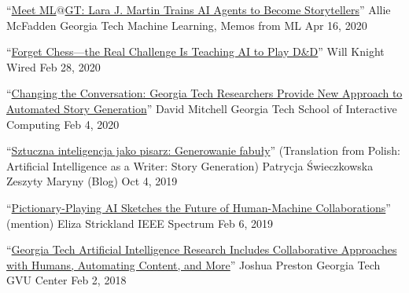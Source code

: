   \cvmedia
    {``\href{https://mlatgt.blog/2020/04/16/meet-mlgt-lara-j-martin-trains-ai-agents-to-become-storytellers/}{Meet ML$@$GT: Lara J. Martin Trains AI Agents to Become Storytellers}''} %
    {Allie McFadden} %
    {Georgia Tech Machine Learning, Memos from ML\@GT} %
    {Apr 16, 2020} %

  \cvmedia
    {``\href{https://www.wired.com/story/forget-chess-real-challenge-teaching-ai-play-dandd/}{Forget Chess---the Real Challenge Is Teaching AI to Play D\&D}''} %
    {Will Knight} %
    {Wired} %
    {Feb 28, 2020} %

  \cvmedia
    {``\href{https://www.ic.gatech.edu/news/632082/changing-conversation-georgia-tech-researchers-provide-new-approach-automated-story}{Changing the Conversation: Georgia Tech Researchers Provide New Approach to Automated Story Generation}''} %
    {David Mitchell} %
    {Georgia Tech School of Interactive Computing} %
    {Feb 4, 2020} %

  \cvmedia
    {``\href{https://zeszytymaryny.pl/naukowo/sztuczna-inteligencja-jako-pisarz-generowanie-fabuly/}{Sztuczna inteligencja jako pisarz: Generowanie fabuły}'' \newline (Translation from Polish: Artificial Intelligence as a Writer: Story Generation)} %
    {Patrycja Świeczkowska} %
    {Zeszyty Maryny (Blog)} %
    {Oct 4, 2019} %


  \cvmedia
    {``\href{https://spectrum.ieee.org/tech-talk/robotics/artificial-intelligence/pictionary-playing-ai-sketches-the-future-of-human-machine-collaborations}{Pictionary-Playing AI Sketches the Future of Human-Machine Collaborations}'' (mention)} %
    {Eliza Strickland} %
    {IEEE Spectrum} %
    {Feb 6, 2019} %


  \cvmedia
    {``\href{https://gvu.gatech.edu/georgia-tech-aaai2018}{Georgia Tech Artificial Intelligence Research Includes Collaborative Approaches with Humans, Automating Content, and More}''} %
    {Joshua Preston} %
    {Georgia Tech GVU Center} %
    {Feb 2, 2018} %




